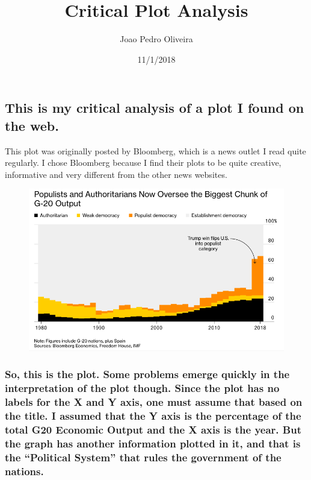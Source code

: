 \documentclass[]{article}
\title{Critical Plot Analysis}
\author{Joao Pedro Oliveira}
\date{11/1/2018}
\begin{document}
\maketitle

\subsection{This is my critical analysis of a plot I found on the
web.}\label{this-is-my-critical-analysis-of-a-plot-i-found-on-the-web.}

This plot was originally posted by Bloomberg, which is a news outlet I
read quite regularly. I chose Bloomberg because I find their plots to be
quite creative, informative and very different from the other news
websites.

\begin{figure}
\centering
\includegraphics{plot.png}
\caption{}
\end{figure}

\subsubsection{\texorpdfstring{So, this is the plot. Some problems
emerge quickly in the interpretation of the plot though. Since the plot
has no labels for the X and Y axis, one must assume that based on the
title. I assumed that the Y axis is the percentage of the total G20
Economic Output and the X axis is the year. But the graph has another
information plotted in it, and that is the ``Political System'' that
rules the government of the
nations.}{So, this is the plot. Some problems emerge quickly in the interpretation of the plot though. Since the plot has no labels for the X and Y axis, one must assume that based on the title. I assumed that the Y axis is the percentage of the total G20 Economic Output and the X axis is the year. But the graph has another information plotted in it, and that is the Political System that rules the government of the nations.}}\label{so-this-is-the-plot.-some-problems-emerge-quickly-in-the-interpretation-of-the-plot-though.-since-the-plot-has-no-labels-for-the-x-and-y-axis-one-must-assume-that-based-on-the-title.-i-assumed-that-the-y-axis-is-the-percentage-of-the-total-g20-economic-output-and-the-x-axis-is-the-year.-but-the-graph-has-another-information-plotted-in-it-and-that-is-the-political-system-that-rules-the-government-of-the-nations.}
\end{document}
